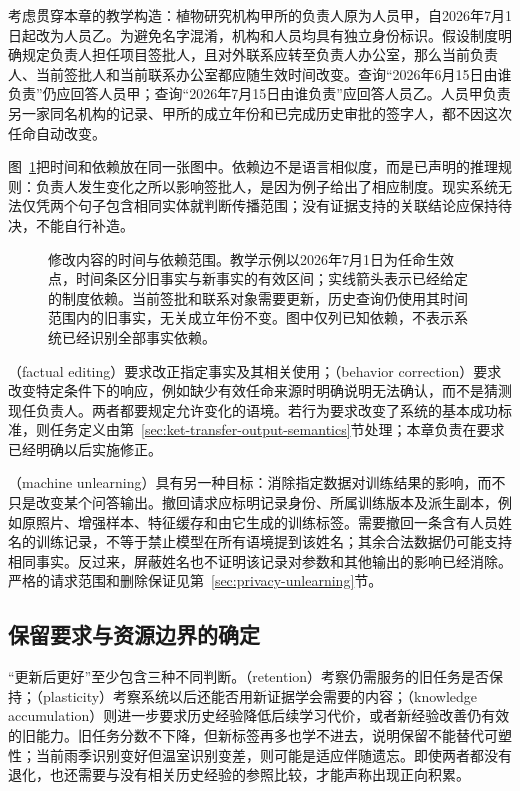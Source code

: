 考虑贯穿本章的教学构造：植物研究机构甲所的负责人原为人员甲，自2026年7月1日起改为人员乙。为避免名字混淆，机构和人员均具有独立身份标识。假设制度明确规定负责人担任项目签批人，且对外联系应转至负责人办公室，那么当前负责人、当前签批人和当前联系办公室都应随生效时间改变。查询“2026年6月15日由谁负责”仍应回答人员甲；查询“2026年7月15日由谁负责”应回答人员乙。人员甲负责另一家同名机构的记录、甲所的成立年份和已完成历史审批的签字人，都不因这次任命自动改变。

图~\ref{fig:ket-update-time-scope}把时间和依赖放在同一张图中。依赖边不是语言相似度，而是已声明的推理规则：负责人发生变化之所以影响签批人，是因为例子给出了相应制度。现实系统无法仅凭两个句子包含相同实体就判断传播范围；没有证据支持的关联结论应保持待决，不能自行补造。

\begin{figure}[htbp]
\centering

\caption{修改内容的时间与依赖范围。教学示例以2026年7月1日为任命生效点，时间条区分旧事实与新事实的有效区间；实线箭头表示已经给定的制度依赖。当前签批和联系对象需要更新，历史查询仍使用其时间范围内的旧事实，无关成立年份不变。图中仅列已知依赖，不表示系统已经识别全部事实依赖。}
\label{fig:ket-update-time-scope}
\end{figure}

（factual editing）要求改正指定事实及其相关使用；（behavior correction）要求改变特定条件下的响应，例如缺少有效任命来源时明确说明无法确认，而不是猜测现任负责人。两者都要规定允许变化的语境。若行为要求改变了系统的基本成功标准，则任务定义由第~\ref{sec:ket-transfer-output-semantics}节处理；本章负责在要求已经明确以后实施修正。

（machine unlearning）具有另一种目标：消除指定数据对训练结果的影响，而不只是改变某个问答输出。撤回请求应标明记录身份、所属训练版本及派生副本，例如原照片、增强样本、特征缓存和由它生成的训练标签。需要撤回一条含有人员姓名的训练记录，不等于禁止模型在所有语境提到该姓名；其余合法数据仍可能支持相同事实。反过来，屏蔽姓名也不证明该记录对参数和其他输出的影响已经消除。严格的请求范围和删除保证见第~\ref{sec:privacy-unlearning}节。

\subsection{保留要求与资源边界的确定}
\label{sec:ket-update-requirements}

“更新后更好”至少包含三种不同判断。（retention）考察仍需服务的旧任务是否保持；（plasticity）考察系统以后还能否用新证据学会需要的内容；（knowledge accumulation）则进一步要求历史经验降低后续学习代价，或者新经验改善仍有效的旧能力。旧任务分数不下降，但新标签再多也学不进去，说明保留不能替代可塑性；当前雨季识别变好但温室识别变差，则可能是适应伴随遗忘。即使两者都没有退化，也还需要与没有相关历史经验的参照比较，才能声称出现正向积累。

